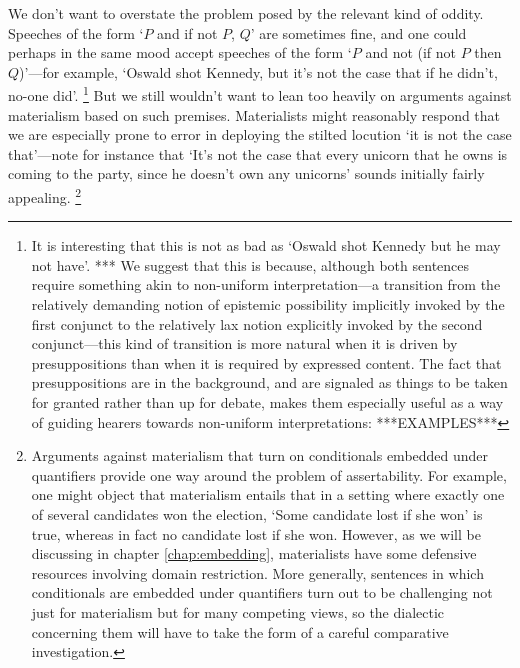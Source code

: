 \documentclass[If.tex]{subfiles}
\begin{document}
\begin{prop}
We don't want to overstate the problem posed by the relevant kind of oddity.  Speeches of the form ‘$P$ and if not $P$, $Q$’ are sometimes fine, and one could perhaps in the same mood accept speeches of the form ‘$P$ and not (if not $P$ then $Q$)’---for example, ‘Oswald shot Kennedy, but it's not the case that if he didn't, no-one did’.%
\footnote{It is interesting that this is not as bad as ‘Oswald shot Kennedy but he may not have’.  
*** We suggest that this is because, although both sentences require something akin to non-uniform interpretation---a transition from the relatively demanding notion of epistemic possibility implicitly invoked by the first conjunct to the relatively lax notion explicitly invoked by the second conjunct---this kind of transition is more natural when it is driven by presuppositions than when it is required by expressed content.  The fact that presuppositions are in the background, and are signaled as things to be taken for granted rather than up for debate, makes them especially useful as a way of guiding hearers towards non-uniform interpretations: ***EXAMPLES***}
But we still wouldn't want to lean too heavily on arguments against materialism based on such premises.  Materialists might reasonably respond that we are especially prone to error in deploying the stilted locution ‘it is not the case that’---note for instance that ‘It's not the case that every unicorn that he owns is coming to the party, since he doesn't own any unicorns’ sounds initially fairly appealing.%
\footnote{Arguments against materialism that turn on conditionals embedded under quantifiers provide one way around the problem of assertability.  For example, one might object that materialism entails that in a setting where exactly one of several candidates won the election, ‘Some candidate lost if she won’ is true, whereas in fact no candidate lost if she won.  However, as we will be discussing in chapter \autoref{chap:embedding}, materialists have some defensive resources involving domain restriction.  More generally, sentences in which conditionals are embedded under quantifiers turn out to be challenging not just for materialism but for many competing views, so the dialectic concerning them will have to take the form of a careful comparative investigation.}  


\end{prop}
\end{document}
